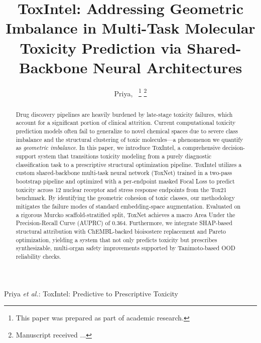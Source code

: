 \documentclass[lettersize,journal]{IEEEtran}
\begin{document}
\title{ToxIntel: Addressing Geometric Imbalance in Multi-Task Molecular Toxicity Prediction via Shared-Backbone Neural Architectures}

\author{Priya,~
\thanks{This paper was prepared as part of academic research.}%
\thanks{Manuscript received ...}}

%
{Priya \MakeLowercase{\textit{et al.}}: ToxIntel: Predictive to Prescriptive Toxicity}


\maketitle

\begin{abstract}
Drug discovery pipelines are heavily burdened by late-stage toxicity failures, which account for a significant portion of clinical attrition. Current computational toxicity prediction models often fail to generalize to novel chemical spaces due to severe class imbalance and the structural clustering of toxic molecules—a phenomenon we quantify as \textit{geometric imbalance}. In this paper, we introduce ToxIntel, a comprehensive decision-support system that transitions toxicity modeling from a purely diagnostic classification task to a prescriptive structural optimization pipeline. ToxIntel utilizes a custom shared-backbone multi-task neural network (ToxNet) trained in a two-pass bootstrap pipeline and optimized with a per-endpoint masked Focal Loss to predict toxicity across 12 nuclear receptor and stress response endpoints from the Tox21 benchmark. By identifying the geometric cohesion of toxic classes, our methodology mitigates the failure modes of standard embedding-space augmentation. Evaluated on a rigorous Murcko scaffold-stratified split, ToxNet achieves a macro Area Under the Precision-Recall Curve (AUPRC) of 0.364. Furthermore, we integrate SHAP-based structural attribution with ChEMBL-backed bioisostere replacement and Pareto optimization, yielding a system that not only predicts toxicity but prescribes synthesizable, multi-organ safety improvements supported by Tanimoto-based OOD reliability checks.
\end{abstract}
\end{document}
